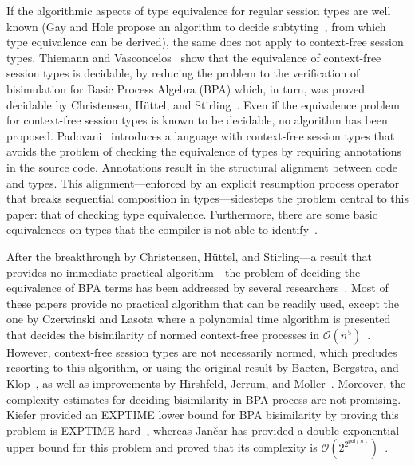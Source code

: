 If the algorithmic aspects of type equivalence for regular session
types are well known (Gay and Hole propose an algorithm to decide
subtyting~\cite{DBLP:journals/acta/GayH05}, from which type
equivalence can be derived), the same does not apply to context-free
session types.
%
Thiemann and Vasconcelos~\cite{thiemann2016context} show that the
equivalence of context-free session types is decidable, by reducing
the problem to the verification of bisimulation for Basic Process
Algebra (BPA) which, in turn, was proved decidable by Christensen,
H{\"{u}}ttel, and Stirling~\cite{DBLP:journals/iandc/ChristensenHS95}.
%
Even if the equivalence problem for context-free session types is
known to be decidable, no algorithm has been proposed.
%
Padovani~\cite{DBLP:conf/esop/Padovani17} introduces a language with
context-free session types that avoids the problem of checking the
equivalence of types by requiring annotations in the source
code. Annotations result in the structural alignment between code and
types. This alignment---enforced by an explicit resumption process
operator that breaks sequential composition in types---sidesteps the
problem central to this paper: that of checking type equivalence.
Furthermore, there are some basic equivalences on types that the
compiler is not able to identify~\cite{DBLP:conf/esop/Padovani17}.

After the breakthrough by Christensen, H\"uttel, and Stirling---a
result that provides no immediate practical algorithm---the problem of
deciding the equivalence of BPA terms has been addressed by several
researchers~\cite{DBLP:conf/mfcs/BurkartCS95,DBLP:journals/iandc/ChristensenHS95,czerwinski2010fast,janvcar1999techniques}.
Most of these papers provide no practical algorithm that can be
readily used, except the one by Czerwinski and Lasota where a
polynomial time algorithm is presented that decides the bisimilarity
of normed context-free processes in
$\mathcal{O}(n^5)$~\cite{czerwinski2010fast}.
%
However, context-free session types are not necessarily normed, which
precludes resorting to this algorithm, or using the original result by
Baeten, Bergstra, and Klop~\cite{baeten1993decidability}, as well as
improvements by Hirshfeld, Jerrum, and
Moller~\cite{DBLP:journals/tcs/HirshfeldJM96,DBLP:conf/concur/HirshfeldM94}.
Moreover, the complexity estimates for deciding bisimilarity in BPA
process are not promising. Kiefer provided an EXPTIME lower bound for
BPA bisimilarity by proving this problem is
EXPTIME-hard~\cite{kiefer2013bpa}, whereas Jan\v car has provided a
double exponential upper bound for this problem and proved that its
complexity is
$\mathcal{O}(2^{2^{\mathsf{pol}(n)}})$~\cite{jancar2012bisimilarity}.

